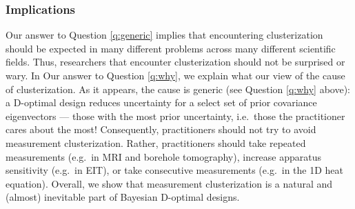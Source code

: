 \begin{enumerate}




\end{enumerate}

\subsubsection{Implications}
Our answer to Question \ref{q:generic} implies that encountering
clusterization should be expected in many different problems across
many different scientific fields. Thus, researchers that encounter
clusterization should not be surprised or wary. In Our answer to
Question \ref{q:why}, we explain what our view of the cause of
clusterization. As it appears, the cause is generic (see Question
\ref{q:why} above): a D-optimal design reduces uncertainty for a
select set of prior covariance eigenvectors --- those with the most
prior uncertainty, i.e.~those the practitioner cares about the most!
Consequently, practitioners should not try to avoid measurement
clusterization. Rather, practitioners should take repeated
measurements (e.g.~in MRI and borehole tomography), increase apparatus
sensitivity (e.g.~in EIT), or take consecutive measurements (e.g.~in
the 1D heat equation). Overall, we show that measurement
clusterization is a natural and (almost) inevitable part of Bayesian
D-optimal designs.

